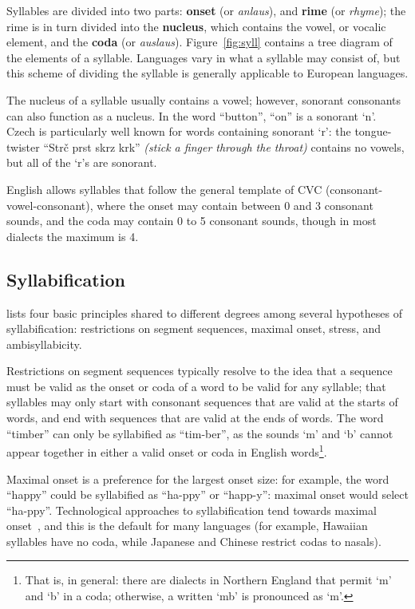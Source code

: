 \documentclass{article}[11pt]
\begin{document}
Syllables are divided into two parts: \textbf{onset} (or \textit{anlaus}), and \textbf{rime} (or \textit{rhyme}); the rime is in turn divided into the \textbf{nucleus}, which contains the vowel, or vocalic element, and the \textbf{coda} (or \textit{auslaus}). Figure~\ref{fig:syll} contains a tree diagram of the elements of a syllable. Languages vary in what a syllable may consist of, but this scheme of dividing the syllable is generally applicable to European languages.

The nucleus of a syllable usually contains a vowel; however, sonorant consonants can also function as a nucleus. In the word ``button'', ``on'' is a sonorant `n'. Czech is particularly well known for words containing sonorant `r': the tongue-twister ``Str\v{c} prst skrz krk'' \textit{(stick a finger through the throat)} contains no vowels, but all of the `r's are sonorant.

English allows syllables that follow the general template of CVC (consonant-vowel-consonant), where the onset may contain between 0 and 3 consonant sounds, and the coda may contain 0 to 5 consonant sounds, though in most dialects the maximum is 4.

\subsection{Syllabification}
\label{ssect:syllabification}

\citet{fallows_experimental_1981} lists four basic principles shared to different degrees among several hypotheses of syllabification: restrictions on segment sequences, maximal onset, stress, and ambisyllabicity.

Restrictions on segment sequences typically resolve to the idea that a sequence must be valid as the onset or coda of a word to be valid for any syllable; that syllables may only start with consonant sequences that are valid at the starts of words, and end with sequences that are valid at the ends of words. The word ``timber'' can only be syllabified as ``tim-ber'', as the sounds `m' and `b' cannot appear together in either a valid onset or coda in English words\footnote{That is, in general: there are dialects in Northern England that permit `m' and `b' in a coda; otherwise, a written `mb' is pronounced as `m'.}.

Maximal onset is a preference for the largest onset size: for example, the word ``happy'' could be syllabified as ``ha-ppy'' or ``happ-y'': maximal onset would select ``ha-ppy''. Technological approaches to syllabification tend towards maximal onset~\citep{ladefoged_course_2011}, and this is the default for many languages (for example, Hawaiian syllables have no coda, while Japanese and Chinese restrict codas to nasals).
\end{document}
